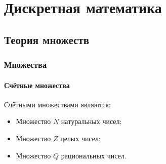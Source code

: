 \part{Дискретная математика}

\chapter{Теория множеств}

\section{Множества}

\subsection{Счётные множества}

Счётными множествами являются:
\begin{itemize}
	\item Множество $N$ натуральных чисел;
	\item Множество $Z$ целых чисел;
	\item Множество $Q$ рациональных чисел.
\end{itemize}

